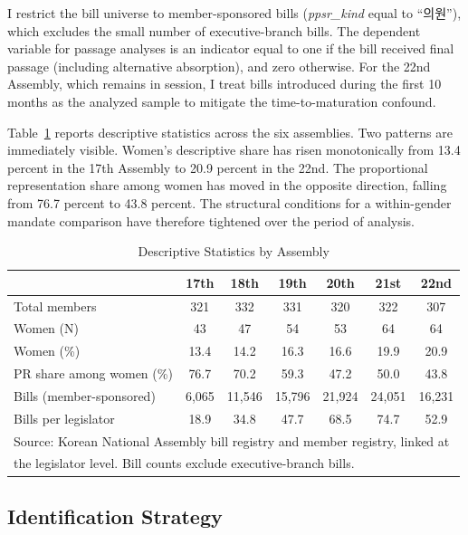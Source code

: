 \documentclass[11pt]{article}
\begin{document}
I restrict the bill universe to member-sponsored bills (\textit{ppsr\_kind} equal to ``의원''), which excludes the small number of executive-branch bills. The dependent variable for passage analyses is an indicator equal to one if the bill received final passage (including alternative absorption), and zero otherwise. For the 22nd Assembly, which remains in session, I treat bills introduced during the first 10 months as the analyzed sample to mitigate the time-to-maturation confound.

Table~\ref{tab:desc} reports descriptive statistics across the six assemblies. Two patterns are immediately visible. Women's descriptive share has risen monotonically from 13.4 percent in the 17th Assembly to 20.9 percent in the 22nd. The proportional representation share among women has moved in the opposite direction, falling from 76.7 percent to 43.8 percent. The structural conditions for a within-gender mandate comparison have therefore tightened over the period of analysis.

\begin{table}[H]
\centering
\caption{Descriptive Statistics by Assembly}
\label{tab:desc}
\begin{tabular}{lcccccc}
\toprule
 & 17th & 18th & 19th & 20th & 21st & 22nd \\
\midrule
Total members & 321 & 332 & 331 & 320 & 322 & 307 \\
Women (N) & 43 & 47 & 54 & 53 & 64 & 64 \\
Women (\%) & 13.4 & 14.2 & 16.3 & 16.6 & 19.9 & 20.9 \\
PR share among women (\%) & 76.7 & 70.2 & 59.3 & 47.2 & 50.0 & 43.8 \\
Bills (member-sponsored) & 6{,}065 & 11{,}546 & 15{,}796 & 21{,}924 & 24{,}051 & 16{,}231 \\
Bills per legislator & 18.9 & 34.8 & 47.7 & 68.5 & 74.7 & 52.9 \\
\bottomrule
\multicolumn{7}{l}{\footnotesize Source: Korean National Assembly bill registry and member registry, linked at} \\
\multicolumn{7}{l}{\footnotesize the legislator level. Bill counts exclude executive-branch bills.} \\
\end{tabular}
\end{table}

\subsection{Identification Strategy}
\end{document}

